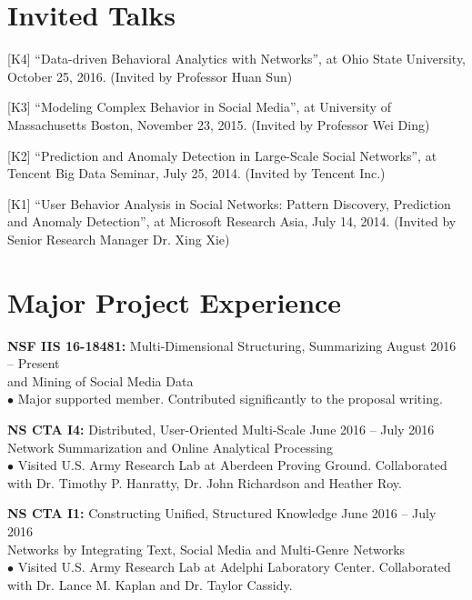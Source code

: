 \documentclass[margin, 10pt]{res}
\begin{document}
\begin{resume}

\section{Invited Talks}

[K4] ``Data-driven Behavioral Analytics with Networks'', at Ohio State University, October 25, 2016. (Invited by Professor Huan Sun)

[K3] ``Modeling Complex Behavior in Social Media'', at University of Massachusetts Boston, November 23, 2015. (Invited by Professor Wei Ding)

[K2] ``Prediction and Anomaly Detection in Large-Scale Social Networks'', at Tencent Big Data Seminar, July 25, 2014. (Invited by Tencent Inc.)

[K1] ``User Behavior Analysis in Social Networks: Pattern Discovery, Prediction and Anomaly Detection'', at Microsoft Research Asia, July 14, 2014. (Invited by Senior Research Manager Dr. Xing Xie)


\section{Major Project Experience}

{\textbf{NSF IIS 16-18481:} Multi-Dimensional Structuring, Summarizing} \hfill{August 2016 -- Present} \\
{and Mining of Social Media Data} \\
$\bullet$ Major supported member. Contributed significantly to the proposal writing.

{\textbf{NS CTA I4:} Distributed, User-Oriented Multi-Scale} \hfill{June 2016 -- July 2016} \\
{Network Summarization and Online Analytical Processing} \\
$\bullet$ Visited U.S. Army Research Lab at Aberdeen Proving Ground.
Collaborated with Dr. Timothy P. Hanratty, Dr. John Richardson and Heather Roy.

{\textbf{NS CTA I1:} Constructing Unified, Structured Knowledge} \hfill{June 2016 -- July 2016} \\
{Networks by Integrating Text, Social Media and Multi-Genre Networks} \hfill{} \\
$\bullet$ Visited U.S. Army Research Lab at Adelphi Laboratory Center. Collaborated with Dr. Lance M. Kaplan and Dr. Taylor Cassidy.


\end{resume}
\end{document}

